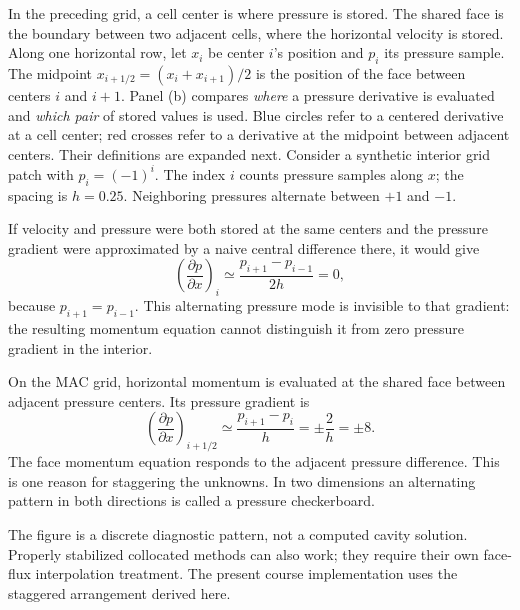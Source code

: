 In the preceding grid, a cell center is where pressure is stored. The shared
face is the boundary between two adjacent cells, where the horizontal velocity
is stored. Along one horizontal row, let $x_i$ be center $i$'s position and
$p_i$ its pressure sample. The midpoint $x_{i+1/2}=(x_i+x_{i+1})/2$ is the
position of the face between centers $i$ and $i+1$.
Panel (b) compares \emph{where} a pressure derivative is evaluated and
\emph{which pair} of stored values is used. Blue circles refer to a centered
derivative at a cell center; red crosses refer to a derivative at the
midpoint between adjacent centers. Their definitions are expanded next.
\newpage
{}
Consider a synthetic interior grid patch with $p_i=(-1)^i$. The index $i$
counts pressure samples along $x$; the spacing is $h=0.25$. Neighboring
pressures alternate between $+1$ and $-1$.

If velocity and pressure were both stored at the same centers and the pressure
gradient were approximated by a naive central difference there, it would give
\[
\left(\frac{\partial p}{\partial x}\right)_i
\simeq\frac{p_{i+1}-p_{i-1}}{2h}=0,
\]
because $p_{i+1}=p_{i-1}$. This alternating pressure mode is invisible to that
gradient: the resulting momentum equation cannot distinguish it from zero
pressure gradient in the interior.

On the MAC grid, horizontal momentum is evaluated at the shared face between
adjacent pressure centers. Its pressure gradient is
\[
\left(\frac{\partial p}{\partial x}\right)_{i+1/2}
\simeq\frac{p_{i+1}-p_i}{h}=\pm\frac{2}{h}=\pm8.
\]
The face momentum equation responds to the adjacent pressure difference.
This is one reason for staggering the unknowns. In two dimensions an alternating
pattern in both directions is called a pressure checkerboard.

The figure is a discrete diagnostic pattern, not a computed cavity solution.
Properly stabilized collocated methods can also work; they require their own
face-flux interpolation treatment. The present course implementation uses the
staggered arrangement derived here.
